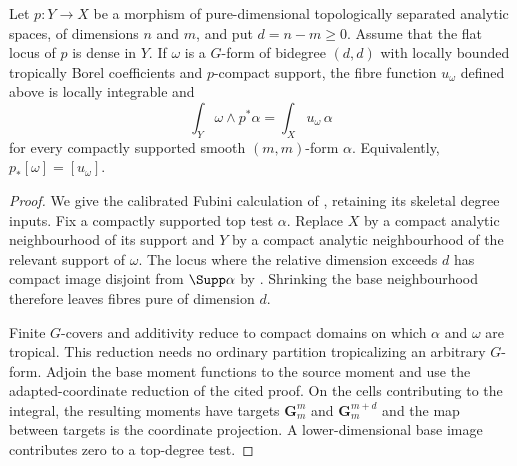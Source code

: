 \begin{theorem}
\label{thm:cld-fibre-integration}
Let $p:Y\to X$ be a morphism of pure-dimensional topologically
separated analytic spaces, of dimensions $n$ and $m$, and put
$d=n-m\ge0$. Assume that the flat locus of $p$ is dense in $Y$.
If $\omega$ is a $G$-form of bidegree $(d,d)$ with locally bounded
tropically Borel coefficients and $p$-compact support, the fibre
function $u_\omega$ defined above is locally integrable and
\[
 \int_Y\omega\wedge p^*\alpha=\int_Xu_\omega\,\alpha
\]
for every compactly supported smooth $(m,m)$-form $\alpha$.
Equivalently, $p_*[\omega]=[u_\omega]$.
\end{theorem}
\begin{proof}
We give the calibrated Fubini calculation of
\cite[Theorem~16.5.4 and Corollary~16.5.5]{CLD25}, retaining its
skeletal degree inputs. Fix a compactly supported top test $\alpha$.
Replace $X$ by a compact analytic neighbourhood of its support and
$Y$ by a compact analytic neighbourhood of the relevant support of
$\omega$. The locus where the relative dimension exceeds $d$ has
compact image disjoint from $\Supp\alpha$ by
\cite[Remark~16.5.2(c)]{CLD25}. Shrinking the base neighbourhood
therefore leaves fibres pure of dimension $d$.

Finite $G$-covers and additivity reduce to compact domains on which
$\alpha$ and $\omega$ are tropical. This reduction needs no ordinary
partition tropicalizing an arbitrary $G$-form. Adjoin the base moment
functions to the source moment and use the adapted-coordinate reduction
of the cited proof. On the cells contributing to the integral, the
resulting moments have targets $\mathbf G_m^m$ and
$\mathbf G_m^{m+d}$ and the map between targets is the coordinate
projection. A lower-dimensional base image contributes zero to a
top-degree test.


\end{proof}
